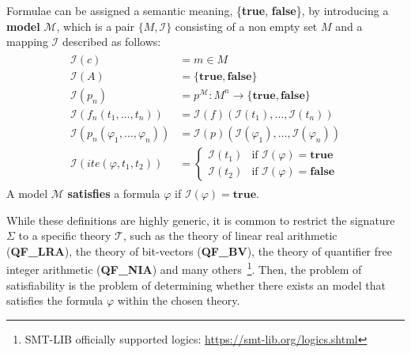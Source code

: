 \documentclass[runningheads]{llncs}
\begin{document}
Formulae can be assigned a semantic meaning, \{\textbf{true}, \textbf{false}\}, by introducing a \textbf{model} $\mathcal{M}$, which is a pair $\{M, \mathcal{I}\}$ consisting of a non empty set $M$ and a mapping $\mathcal{I}$ described as follows:
\begin{gather*}
    \begin{array}{ll}
        \mathcal{I}(c)                                & = m \in M                                                               \\
        \mathcal{I}(A)                                & = \{\textbf{true}, \textbf{false}\}                                     \\
        \mathcal{I}(p_n)                              & = p^{\mathcal{M}} : M^n \rightarrow \{\textbf{true}, \textbf{false}\}   \\
        \mathcal{I}(f_n(t_1, \dots, t_n))             & = \mathcal{I}(f)(\mathcal{I}(t_1), \dots, \mathcal{I}(t_n))             \\
        \mathcal{I}(p_n(\varphi_1, \dots, \varphi_n)) & = \mathcal{I}(p)(\mathcal{I}(\varphi_1), \dots, \mathcal{I}(\varphi_n)) \\
        \mathcal{I}(ite(\varphi, t_1, t_2))           & = \begin{cases}
                                                              \mathcal{I}(t_1) & \text{if } \mathcal{I}(\varphi) = \textbf{true}  \\
                                                              \mathcal{I}(t_2) & \text{if } \mathcal{I}(\varphi) = \textbf{false}
                                                          \end{cases}
    \end{array}
\end{gather*}
A model $\mathcal{M}$ \textbf{satisfies} a formula $\varphi$ if $\mathcal{I}(\varphi) = \textbf{true}$.

While these definitions are highly generic, it is common to restrict the signature $\Sigma$ to a specific theory $\mathcal{T}$, such as the theory of linear real arithmetic (\textbf{QF\_LRA}), the theory of bit-vectors (\textbf{QF\_BV}), the theory of quantifier free integer arithmetic (\textbf{QF\_NIA}) and many others~\footnote{SMT-LIB officially supported logics: \url{https://smt-lib.org/logics.shtml}}.
Then, the problem of satisfiability is the problem of determining whether there exists an model that satisfies the formula $\varphi$ within the chosen theory.
\end{document}

